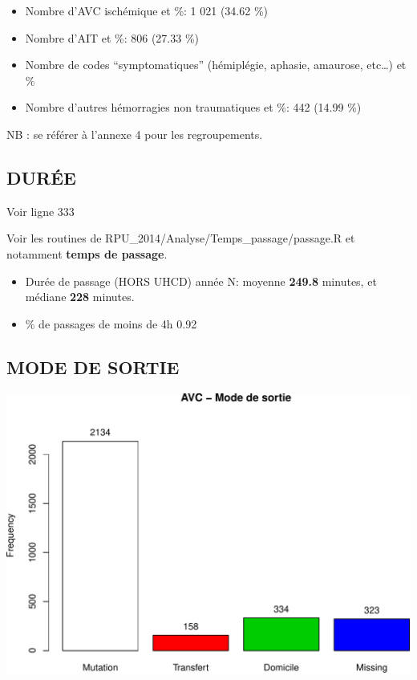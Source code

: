 \documentclass[]{article}
\begin{document}
\begin{itemize}
\itemsep1pt\parskip0pt
\item
  Nombre d'AVC ischémique et \%: 1 021 (34.62 \%)
\item
  Nombre d'AIT et \%: 806 (27.33 \%)
\item
  Nombre de codes ``symptomatiques'' (hémiplégie, aphasie, amaurose,
  etc\ldots{}) et \%
\item
  Nombre d'autres hémorragies non traumatiques et \%: 442 (14.99 \%)
\end{itemize}

NB : se référer à l'annexe 4 pour les regroupements.

\subsection{DURÉE}\label{duree-1}

Voir ligne 333

Voir les routines de RPU\_2014/Analyse/Temps\_passage/passage.R et
notamment \textbf{temps de passage}.

\begin{itemize}
\itemsep1pt\parskip0pt
\item
  Durée de passage (HORS UHCD) année N: moyenne \textbf{249.8} minutes,
  et médiane \textbf{228} minutes.
\item
  \% de passages de moins de 4h 0.92
\end{itemize}

\subsection{MODE DE SORTIE}\label{mode-de-sortie-2}

\includegraphics{rapport2014_V4_files/figure-latex/avc_mode_sortie-1.pdf}
\end{document}

